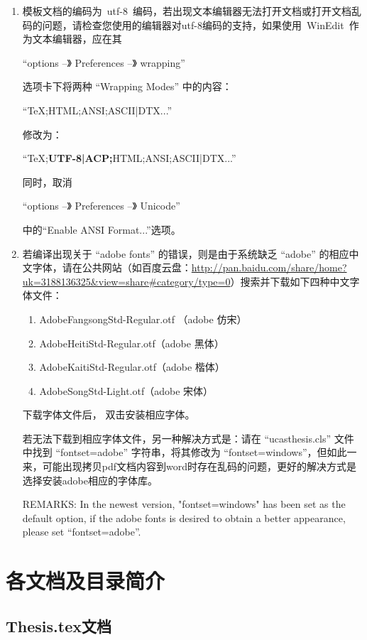 \begin{enumerate}
  \item 模板文档的编码为~utf-8~编码，若出现文本编辑器无法打开文档或打开文档乱码的问题，请检查您使用的编辑器对utf-8编码的支持，如果使用~WinEdit~作为文本编辑器，应在其

  “options --》 Preferences --》 wrapping”

  选项卡下将两种 “Wrapping Modes” 中的内容：

  “TeX;HTML;ANSI;ASCII|DTX...”

  修改为：

  “TeX;\textbf{UTF-8|ACP;}HTML;ANSI;ASCII|DTX...”

  同时，取消

  “options --》 Preferences --》 Unicode”

  中的“Enable ANSI Format...”选项。

  \item 若编译出现关于 “adobe fonts” 的错误，则是由于系统缺乏 “adobe” 的相应中文字体，请在公共网站（如百度云盘：\url{http://pan.baidu.com/share/home?uk=3188136325&view=share#category/type=0}）搜索并下载如下四种中文字体文件：
      \begin{enumerate}
        \item AdobeFangsongStd-Regular.otf （adobe 仿宋）
        \item AdobeHeitiStd-Regular.otf（adobe 黑体）
        \item AdobeKaitiStd-Regular.otf（adobe 楷体）
        \item AdobeSongStd-Light.otf（adobe 宋体）
      \end{enumerate}

	  下载字体文件后， 双击安装相应字体。
	  
      若无法下载到相应字体文件，另一种解决方式是：请在 “ucasthesis.cls” 文件中找到 “fontset=adobe” 字符串，将其修改为 “fontset=windows”，但如此一来，可能出现拷贝pdf文档内容到word时存在乱码的问题，更好的解决方式是选择安装adobe相应的字体库。
	  
	  REMARKS: In the newest version, "fontset=windows" has been set as the default option, if the adobe fonts is desired to obtain a better appearance, please set “fontset=adobe”.
\end{enumerate}

\section{各文档及目录简介 }

\subsection{Thesis.tex文档 }

